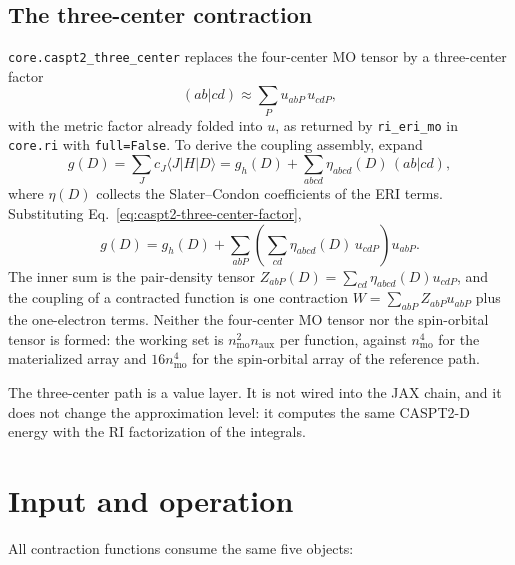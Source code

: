 \subsection{The three-center contraction}

\texttt{core.caspt2\_three\_center} replaces the four-center MO tensor
by a three-center factor
\begin{equation}
  (ab|cd) \approx \sum_P u_{abP}\,u_{cdP},
  \label{eq:caspt2-three-center-factor}
\end{equation}
with the metric factor already folded into $u$, as returned by
\texttt{ri\_eri\_mo} in \texttt{core.ri} with \texttt{full=False}.  To
derive the coupling assembly, expand
\begin{equation}
  g(D) = \sum_J c_J\langle J|H|D\rangle
      = g_h(D) + \sum_{abcd} \eta_{abcd}(D)\,(ab|cd),
  \label{eq:caspt2-g}
\end{equation}
where $\eta(D)$ collects the Slater--Condon coefficients of the ERI
terms.  Substituting Eq.~\eqref{eq:caspt2-three-center-factor},
\begin{equation}
  g(D) = g_h(D)
      + \sum_{abP}\left(\sum_{cd}\eta_{abcd}(D)\,u_{cdP}\right)u_{abP}.
  \label{eq:caspt2-g-factor}
\end{equation}
The inner sum is the pair-density tensor
$Z_{abP}(D)=\sum_{cd}\eta_{abcd}(D)u_{cdP}$, and the coupling of a
contracted function is one contraction
$W=\sum_{abP}Z_{abP}u_{abP}$ plus the one-electron terms.  Neither the
four-center MO tensor nor the spin-orbital tensor is formed: the
working set is $n_{\mathrm{mo}}^2n_{\mathrm{aux}}$ per function,
against $n_{\mathrm{mo}}^4$ for the materialized array and
$16n_{\mathrm{mo}}^4$ for the spin-orbital array of the reference path.

The three-center path is a value layer.  It is not wired into the JAX
chain, and it does not change the approximation level: it computes the
same CASPT2-D energy with the RI factorization of the integrals.

\section{Input and operation}
\label{sec:caspt2-input}

All contraction functions consume the same five objects:

